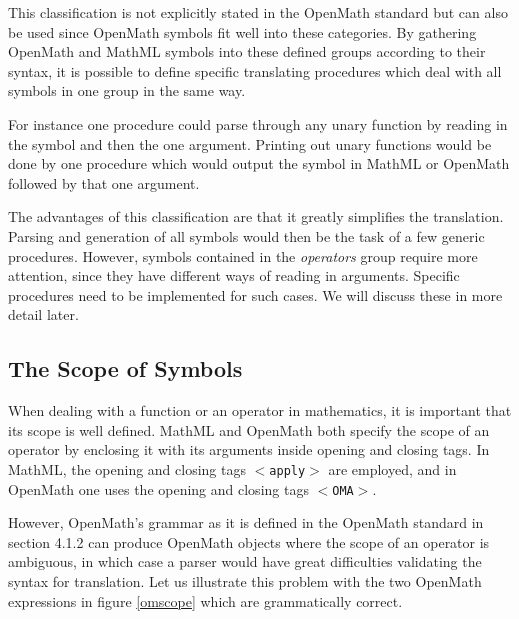 This classification is not explicitly stated in the OpenMath standard
but can also be used since OpenMath symbols fit well into these
categories. By gathering OpenMath and MathML symbols into these defined
groups according to their syntax, it is possible to define specific
translating procedures which deal with all symbols in one group in the
same way.

For instance one procedure could parse through any unary function by
reading in the symbol and then the one argument. Printing out unary
functions would be done by one procedure which would output the symbol
in MathML or OpenMath followed by that one argument.

The advantages of this classification are that it greatly simplifies
the translation.  Parsing and generation of all symbols would then be
the task of a few generic procedures. However, symbols contained in the
{\it operators} group require more attention, since they have different
ways of reading in arguments. Specific procedures need to be
implemented for such cases.  We will discuss these in more detail
later.

\subsection{The Scope of Symbols} \label{scope}

When dealing with a function or an operator in mathematics, it is
important that its scope is well defined. MathML and OpenMath both
specify the scope of an operator by enclosing it with its
arguments inside opening and closing tags. In MathML, the opening and
closing tags \texttt{$<$apply$>$} are employed, and in OpenMath one
uses the opening and closing tags \texttt{$<$OMA$>$}.

However, OpenMath's grammar as it is defined in the OpenMath standard
in section 4.1.2 can produce OpenMath objects where the scope of an
operator is ambiguous, in which case a parser would have great
difficulties validating the syntax for translation. Let us illustrate
this problem with the two OpenMath expressions in figure \ref{omscope} which are grammatically
correct.



